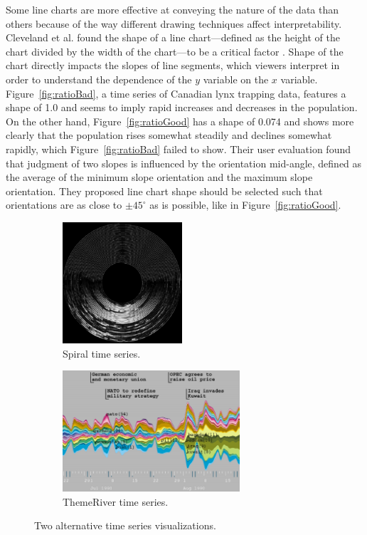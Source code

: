 Some line charts are more effective at conveying the nature of the data than others because of the way different drawing techniques affect interpretability.  Cleveland et al. found the shape of a line chart---defined as the height of the chart divided by the width of the chart---to be a critical factor \cite{cleveland1988}.   Shape of the chart directly impacts the slopes of line segments, which viewers interpret in order to understand the dependence of the $y$ variable on the $x$ variable.  Figure~\ref{fig:ratioBad}, a time series of Canadian lynx trapping data, features a shape of 1.0 and seems to imply rapid increases and decreases in the population.  On the other hand, Figure~\ref{fig:ratioGood} has a shape of 0.074 and shows more clearly that the population rises somewhat steadily and declines somewhat rapidly, which Figure~\ref{fig:ratioBad} failed to show.  Their user evaluation found that judgment of two slopes is influenced by the orientation mid-angle, defined as the average of the minimum slope orientation and the maximum slope orientation.  They proposed line chart shape should be selected such that orientations are as close to $\pm 45 ^{\circ}$ as is possible, like in Figure~\ref{fig:ratioGood}.

\begin{figure}
\centering
	\begin{subfigure}[b]{0.45\textwidth}
		\centering
		\includegraphics[height=4.5cm]{figures/eps/spiral.eps}
		\caption{Spiral time series.}
		\label{fig:altSpiral}
	\end{subfigure}	
	\begin{subfigure}[b]{0.45\textwidth}
		\centering
		\includegraphics[height=4.5cm]{figures/eps/themeriver.eps}
		\caption{ThemeRiver time series.}
		\label{fig:altThemeriver}
	\end{subfigure}
	\caption{Two alternative time series visualizations.}
	\label{fig:tsAlternatives}
\end{figure}

